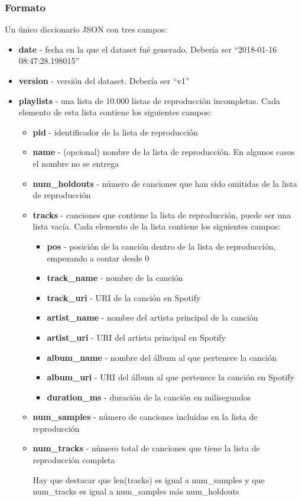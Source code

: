 \documentclass{article}
\begin{document}
	\subsubsection{Formato}
	Un único diccionario JSON con tres campos:
	\begin{itemize}
		\item \textbf{date} - fecha en la que el dataset fué generado. Debería ser ``2018-01-16 08:47:28.198015''
		\item \textbf{version} - versión del dataset. Debería ser ``v1''
		\item \textbf{playlists} - una lista de 10.000 listas de reproducción incompletas. Cada elemento de esta lista contiene los siguientes campos:
		\begin{itemize}
			\item \textbf{pid} - identificador de la lista de reproducción
			\item \textbf{name} - (opcional) nombre de la lista de reproducción. En algunos casos el nombre no se entrega
			\item \textbf{num\_holdouts} - número de canciones que han sido omitidas de la lista de reproducción
			\item \textbf{tracks} - canciones que contiene la lista de reproducción, puede ser una lista vacía. Cada elemento de la lista contiene los siguientes campos:
			\begin{itemize}
				\item \textbf{pos} - posición de la canción dentro de la lista de reproducción, empezando a  contar desde 0
				\item \textbf{track\_name} - nombre de la canción
				\item \textbf{track\_uri} - URI de la canción en Spotify
				\item \textbf{artist\_name} - nombre del artista principal de la canción
				\item \textbf{artist\_uri} - URI del artista principal en Spotify
				\item \textbf{album\_name} - nombre del álbum al que pertenece la canción
				\item \textbf{album\_uri} - URI del álbum al que pertenece la canción en Spotify
				\item \textbf{duration\_ms} - duración de la canción en milisegundos
			\end{itemize}
			\item \textbf{num\_samples} - número de canciones incluidas en la lista de reproducción
			\item \textbf{num\_tracks} - número total de canciones que tiene la lista de reproducción completa

		Hay que destacar que len(tracks) es igual a num\_samples y que num\_tracks es igual a num\_samples más num\_holdouts
		\end{itemize}
	\end{itemize}
\end{document}
